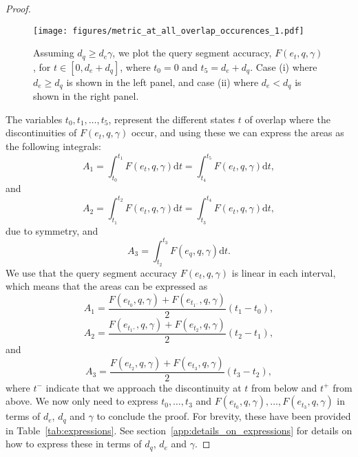 \begin{proof}
\begin{figure}[H]
    \centering
    \texttt{[image: figures/metric\_at\_all\_overlap\_occurences\_1.pdf]}
    \caption{Assuming $d_q \geq d_e \gamma$, we plot the query segment accuracy, $F(e_t, q, \gamma)$, for $t\in [0, d_e + d_q]$, where $t_0 = 0$ and $t_5 = d_e + d_q$. Case (i) where $d_e \geq d_q$ is shown in the left panel, and case (ii) where $d_e < d_q$ is shown in the right panel.}
    \label{fig:query_segment_accuracy}
\end{figure}

The variables $t_0, t_1, \dots, t_5$, represent the different states $t$ of overlap where the discontinuities of $F(e_t, q, \gamma)$ occur, and using these we can express the areas as the following integrals:
\begin{equation}
    A_1 = \int_{t_0}^{t_1} F(e_t, q, \gamma)\mathrm{d}t = \int_{t_4}^{t_5} F(e_t, q, \gamma)\mathrm{d}t,
\end{equation}
and
\begin{equation}
    A_2 = \int_{t_1}^{t_2} F(e_t, q, \gamma)\mathrm{d}t = \int_{t_3}^{t_4} F(e_t, q, \gamma)\mathrm{d}t,
\end{equation}
due to symmetry, and
\begin{equation}
    A_3 = \int_{t_2}^{t_3} F(e_q, q, \gamma)\mathrm{d}t.
\end{equation}
We use that the query segment accuracy $F(e_t, q, \gamma)$ is linear in each interval, which means that the areas can be expressed as
\begin{equation}
\label{eq:a_1}
    A_1 = \frac{F(e_{t_0}, q, \gamma) + F(e_{t_{1^-}}, q, \gamma)}{2} (t_1 - t_0),
\end{equation}
\begin{equation}
\label{eq:a_2}
    A_2 = \frac{F(e_{t_{1^+}}, q, \gamma) + F(e_{t_2}, q, \gamma)}{2} (t_2 - t_1),
\end{equation}
and
\begin{equation}
\label{eq:a_3}
    A_3 = \frac{F(e_{t_2}, q, \gamma) + F(e_{t_3}, q, \gamma)}{2} (t_3 - t_2),
\end{equation}
where $t^-$ indicate that we approach the discontinuity at $t$ from below and $t^+$ from above. We now only need to express $t_0, \dots, t_3$ and $F(e_{t_0}, q, \gamma), \dots, F(e_{t_3}, q, \gamma)$ in terms of $d_e$, $d_q$ and $\gamma$ to conclude the proof. For brevity, these have been provided in Table~\ref{tab:expressions}. See section~\ref{app:details_on_expressions} for details on how to express these in terms of $d_q$, $d_e$ and $\gamma$.


\end{proof}
